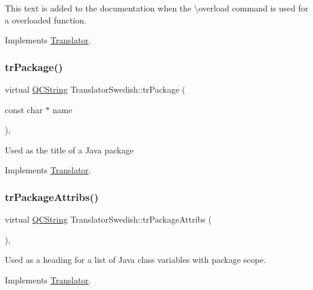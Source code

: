 This text is added to the documentation when the \textbackslash{}overload command is used for a overloaded function. 

Implements \mbox{\hyperlink{class_translator}{Translator}}.

\mbox{\label{class_translator_swedish_a03a56303cd7f3798eb90b1e7d99ae83e}} 
\subsubsection{\texorpdfstring{trPackage()}{trPackage()}}
{\footnotesize\ttfamily virtual \mbox{\hyperlink{class_q_c_string}{Q\+C\+String}} Translator\+Swedish\+::tr\+Package (\begin{DoxyParamCaption}\item[{const char $\ast$}]{name }\end{DoxyParamCaption})\hspace{0.3cm}{\ttfamily [inline]}, {\ttfamily [virtual]}}

Used as the title of a Java package 

Implements \mbox{\hyperlink{class_translator}{Translator}}.

\mbox{\label{class_translator_swedish_a74f6e80719b7e847d8b2aafbce3fc644}} 
\subsubsection{\texorpdfstring{trPackageAttribs()}{trPackageAttribs()}}
{\footnotesize\ttfamily virtual \mbox{\hyperlink{class_q_c_string}{Q\+C\+String}} Translator\+Swedish\+::tr\+Package\+Attribs (\begin{DoxyParamCaption}{ }\end{DoxyParamCaption})\hspace{0.3cm}{\ttfamily [inline]}, {\ttfamily [virtual]}}

Used as a heading for a list of Java class variables with package scope. 

Implements \mbox{\hyperlink{class_translator}{Translator}}.

\mbox{\label{class_translator_swedish_a652d3c2da307b463f9846d12656d1c18}} 
